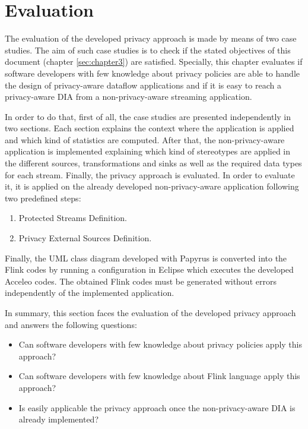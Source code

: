 \chapter[Evaluation]{Evaluation}
\label{sec:chapter5}

The evaluation of the developed privacy approach is made by means of two case studies. The aim of such case studies is to check if the stated objectives of this document (chapter \ref{sec:chapter3}) are satisfied. Specially, this chapter evaluates if software developers with few knowledge about privacy policies are able to handle the design of privacy-aware dataflow applications and if it is easy to reach a privacy-aware DIA from a non-privacy-aware streaming application.

In order to do that, first of all, the case studies are presented independently in two sections. Each section explains the context where the application is applied and which kind of statistics are computed. After that, the non-privacy-aware application is implemented explaining which kind of stereotypes are applied in the different sources, transformations and sinks as well as the required data types for each stream. Finally, the privacy approach is evaluated. In order to evaluate it, it is applied on the already developed non-privacy-aware application following two predefined steps:

\begin{enumerate}
\item Protected Streams Definition.
\item Privacy External Sources Definition.
\end{enumerate}

Finally, the UML class diagram developed with Papyrus is converted into the Flink codes by running a configuration in Eclipse which executes the developed Acceleo codes. The obtained Flink codes must be generated without errors independently of the implemented application.

In summary, this section faces the evaluation of the developed privacy approach and answers the following questions:

\begin{itemize}
\item Can software developers with few knowledge about privacy policies apply this approach?
\item Can software developers with few knowledge about Flink language apply this approach?
\item Is easily applicable the privacy approach once the non-privacy-aware DIA is already implemented?
\end{itemize}

